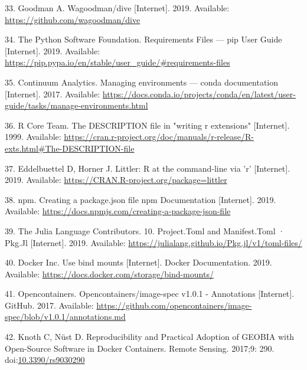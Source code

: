 \documentclass[10pt,letterpaper]{article}
\begin{document}
\leavevmode\hypertarget{ref-goodman_dive_2019}{}%
33. Goodman A. Wagoodman/dive {[}Internet{]}. 2019. Available:
\url{https://github.com/wagoodman/dive}

\leavevmode\hypertarget{ref-the_python_software_foundation_requirements_2019}{}%
34. The Python Software Foundation. Requirements Files --- pip User
Guide {[}Internet{]}. 2019. Available:
\url{https://pip.pypa.io/en/stable/user_guide/\#requirements-files}

\leavevmode\hypertarget{ref-continuum_analytics_managing_2017}{}%
35. Continuum Analytics. Managing environments --- conda documentation
{[}Internet{]}. 2017. Available:
\url{https://docs.conda.io/projects/conda/en/latest/user-guide/tasks/manage-environments.html}

\leavevmode\hypertarget{ref-r_core_team_description_1999}{}%
36. R Core Team. The DESCRIPTION file in "writing r extensions"
{[}Internet{]}. 1999. Available:
\url{https://cran.r-project.org/doc/manuals/r-release/R-exts.html\#The-DESCRIPTION-file}

\leavevmode\hypertarget{ref-eddelbuettel_littler_2019}{}%
37. Eddelbuettel D, Horner J. Littler: R at the command-line via 'r'
{[}Internet{]}. 2019. Available:
\url{https://CRAN.R-project.org/package=littler}

\leavevmode\hypertarget{ref-npm_creating_2019}{}%
38. npm. Creating a package.json file npm Documentation {[}Internet{]}.
2019. Available:
\url{https://docs.npmjs.com/creating-a-package-json-file}

\leavevmode\hypertarget{ref-julia_tomls_2019}{}%
39. The Julia Language Contributors. 10. Project.Toml and Manifest.Toml
· Pkg.Jl {[}Internet{]}. 2019. Available:
\url{https://julialang.github.io/Pkg.jl/v1/toml-files/}

\leavevmode\hypertarget{ref-docker_use_2019}{}%
40. Docker Inc. Use bind mounts {[}Internet{]}. Docker Documentation.
2019. Available: \url{https://docs.docker.com/storage/bind-mounts/}

\leavevmode\hypertarget{ref-opencontainers_image-spec_2017}{}%
41. Opencontainers. Opencontainers/image-spec v1.0.1 - Annotations
{[}Internet{]}. GitHub. 2017. Available:
\url{https://github.com/opencontainers/image-spec/blob/v1.0.1/annotations.md}

\leavevmode\hypertarget{ref-knoth_reproducibility_2017}{}%
42. Knoth C, Nüst D. Reproducibility and Practical Adoption of GEOBIA
with Open-Source Software in Docker Containers. Remote Sensing. 2017;9:
290. doi:\href{https://doi.org/10.3390/rs9030290}{10.3390/rs9030290}
\end{document}
